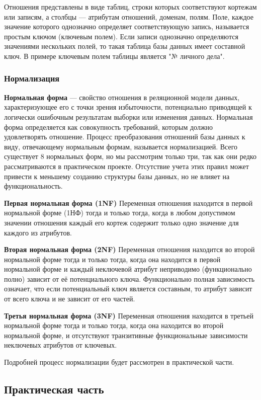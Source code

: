 \documentclass[a4paper]{article}
\begin{document}
Отношения представлены в виде таблиц, строки которых соответствуют кортежам или записям, а столбцы --- атрибутам отношений, доменам, полям. Поле, каждое значение которого однозначно определяет соответствующую запись, называется простым ключом (ключевым полем). Если записи однозначно определяются значениями нескольких полей, то такая таблица базы данных имеет составной ключ. В примере ключевым полем таблицы является "№ личного дела".

\subsubsection{Нормализация}

\textbf{Нормальная форма} --- свойство отношения в реляционной модели данных, характеризующее его с точки зрения избыточности, потенциально приводящей к логически ошибочным результатам выборки или изменения данных. Нормальная форма определяется как совокупность требований, которым должно удовлетворять отношение. Процесс преобразования отношений базы данных к виду, отвечающему нормальным формам, называется нормализацией. Всего существует 8 нормальных форм, но мы рассмотрим только три, так как они редко рассматриваются в практическом проекте. Отсутствие учета этих правил может привести к меньшему созданию структуры базы данных, но не влияет на функциональность.

\textbf{Первая нормальная форма (1NF)} Переменная отношения находится в первой нормальной форме (1НФ) тогда и только тогда, когда в любом допустимом значении отношения каждый его кортеж содержит только одно значение для каждого из атрибутов.

\textbf{Вторая нормальная форма (2NF)} Переменная отношения находится во второй нормальной форме тогда и только тогда, когда она находится в первой нормальной форме и каждый неключевой атрибут неприводимо (функционально полно) зависит от её потенциального ключа. Функционально полная зависимость означает, что если потенциальный ключ является составным, то атрибут зависит от всего ключа и не зависит от его частей.

\textbf{Третья нормальная форма (3NF)} Переменная отношения находится в третьей нормальной форме тогда и только тогда, когда она находится во второй нормальной форме, и отсутствуют транзитивные функциональные зависимости неключевых атрибутов от ключевых.

Подробней процесс нормализации будет рассмотрен в практической части.
\subsection{Практическая часть}
\end{document}
